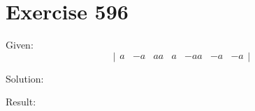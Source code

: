 \documentclass[a4paper, 10pt]{scrartcl}
\begin{document}
\section{Exercise 596}

Given:
\[
\left|
    \begin{array}{ccc}
        a & -a &  a
        a &  a & -a
        a & -a & -a
    \end{array}
\right|
\]

Solution:

Result:
\end{document}
